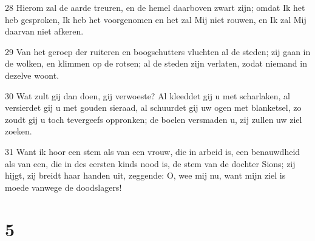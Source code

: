 \par 28 Hierom zal de aarde treuren, en de hemel daarboven zwart zijn; omdat Ik het heb gesproken, Ik heb het voorgenomen en het zal Mij niet rouwen, en Ik zal Mij daarvan niet afkeren.
\par 29 Van het geroep der ruiteren en boogschutters vluchten al de steden; zij gaan in de wolken, en klimmen op de rotsen; al de steden zijn verlaten, zodat niemand in dezelve woont.
\par 30 Wat zult gij dan doen, gij verwoeste? Al kleeddet gij u met scharlaken, al versierdet gij u met gouden sieraad, al schuurdet gij uw ogen met blanketsel, zo zoudt gij u toch tevergeefs oppronken; de boelen versmaden u, zij zullen uw ziel zoeken.
\par 31 Want ik hoor een stem als van een vrouw, die in arbeid is, een benauwdheid als van een, die in des eersten kinds nood is, de stem van de dochter Sions; zij hijgt, zij breidt haar handen uit, zeggende: O, wee mij nu, want mijn ziel is moede vanwege de doodslagers!

\chapter{5}

